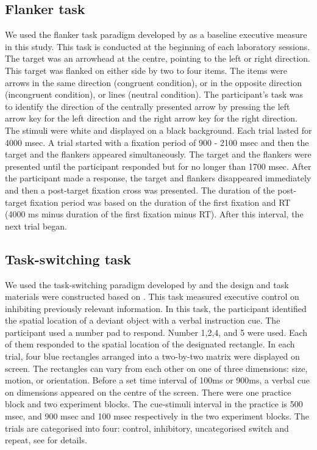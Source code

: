 \subsection{Flanker task}
We used the flanker task paradigm developed by \cite{Eriksen1974} as a baseline executive measure in this study. This task is conducted at the beginning of each laboratory sessions. The target was an arrowhead at the centre, pointing to the left or right direction. This target was flanked on either side by two to four items. The items were arrows in the same direction (congruent condition), or in the opposite direction (incongruent condition), or lines (neutral condition). The participant’s task was to identify the direction of the centrally presented arrow by pressing the left arrow key for the left direction and the right arrow key for the right direction. The stimuli were white and displayed on a black background. Each trial lasted for 4000 msec. A trial started with a fixation period of 900 - 2100 msec and then the target and the flankers appeared simultaneously. The target and the flankers were presented until the participant responded but for no longer than 1700 msec.  After the participant made a response, the target and flankers disappeared immediately and then a post-target fixation cross was presented. The duration of the post-target fixation period was based on the duration of the first fixation and RT (4000 ms minus duration of the first fixation minus RT). After this interval, the next trial began. 
 
\subsection{Task-switching task}
\label{appendix:study1:subsection2:TS}
We used the task-switching paradigm developed by \cite{Mayr2000} and the design and task materials were constructed based on \cite{Whitmer2007}. This task measured executive control on inhibiting previously relevant information. In this task, the participant identified the spatial location of a deviant object with a verbal instruction cue. The participant used a number pad to respond. Number 1,2,4, and 5 were used. Each of them responded to the spatial location of the designated rectangle. In each trial, four blue rectangles arranged into a two-by-two matrix were displayed on screen. The rectangles can vary from each other on one of three dimensions: size, motion, or orientation. Before a set time interval of 100ms or 900ms, a verbal cue on dimensions appeared on the centre of the screen. There were one practice block and two experiment blocks. The cue-stimuli interval in the practice is 500 msec, and 900 msec and 100 msec respectively in the two experiment blocks. The trials are categorised into four: control, inhibitory, uncategorised switch and repeat, see \cite{Whitmer2007} for details. 

